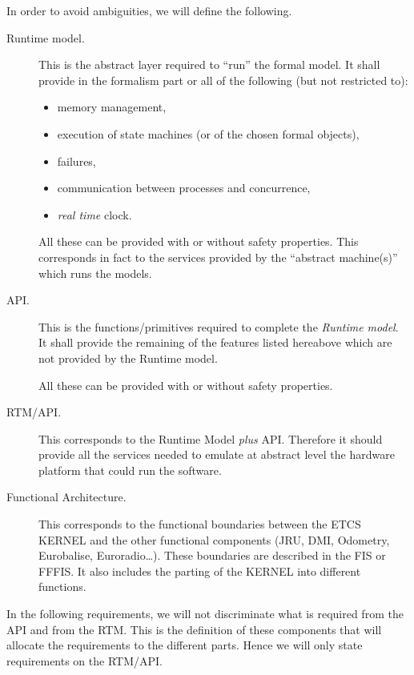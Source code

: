 \documentclass{template/openetcs_article}
\begin{document}
In order to avoid ambiguities, we will define the following.
\begin{description}
\item[Runtime model.] This is the abstract layer required to ``run'' the formal model. It shall provide
in the formalism part or all of the following (but not restricted to):
\begin{itemize}
\item memory management,
\item execution of state machines (or of the chosen formal objects), 
\item failures, 
\item communication between processes and concurrence,
\item \emph{real time} clock.
\end{itemize}
All these can be provided with or without safety properties. This corresponds in fact to the services 
provided by the ``abstract machine(s)'' which runs the models.
\item[API.]
 This is the functions/primitives required to complete the \emph{Runtime model}. It shall provide
the remaining of the features listed hereabove which are not provided by the Runtime model.

All these can be provided with or without safety properties.
\item[RTM/API.]
This corresponds to the Runtime Model \emph{plus} API. Therefore it should provide all the services
needed to emulate at abstract level the hardware platform that could run the software.
\item[Functional Architecture.] This corresponds to the functional boundaries between the ETCS KERNEL 
and the other functional components (JRU, DMI, Odometry, Eurobalise, Euroradio\dots). These boundaries
are described in the FIS or FFFIS. It also includes the parting of the KERNEL into different 
functions.
\end{description}

In the following requirements, we will not discriminate what is required from the API and from the 
RTM. This is the definition of these components that will allocate the requirements to the different 
parts. Hence we will only state requirements on the RTM/API.



\end{document}
